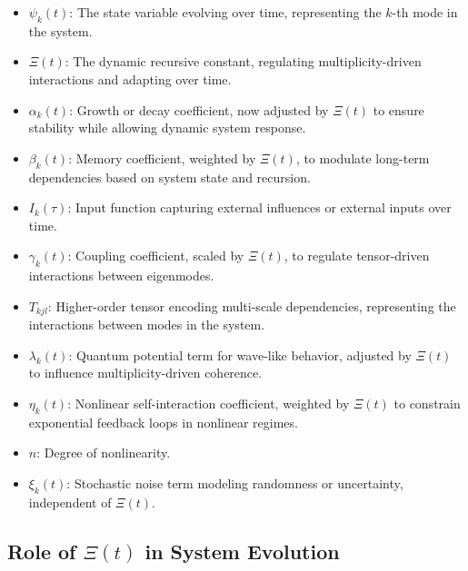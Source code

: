 \documentclass{article}
\theoremstyle{plain}
\begin{document}
\begin{itemize}
\begin{itemize}
    \item \( \psi_k(t) \): The state variable evolving over time, representing the \( k \)-th mode in the system.
    \item \(\Xi(t) \): The dynamic recursive constant, regulating multiplicity-driven interactions and adapting over time.
    \item \( \alpha_k(t) \): Growth or decay coefficient, now adjusted by \(\Xi(t) \) to ensure stability while allowing dynamic system response.
    \item \( \beta_k(t) \): Memory coefficient, weighted by \(\Xi(t) \), to modulate long-term dependencies based on system state and recursion.
    \item \( I_k(\tau) \): Input function capturing external influences or external inputs over time.
    \item \( \gamma_k(t) \): Coupling coefficient, scaled by \(\Xi(t) \), to regulate tensor-driven interactions between eigenmodes.
    \item \( T_{kjl} \): Higher-order tensor encoding multi-scale dependencies, representing the interactions between modes in the system.
    \item \( \lambda_k(t) \): Quantum potential term for wave-like behavior, adjusted by \(\Xi(t) \) to influence multiplicity-driven coherence.
    \item \( \eta_k(t) \): Nonlinear self-interaction coefficient, weighted by \(\Xi(t) \) to constrain exponential feedback loops in nonlinear regimes.
    \item \( n \): Degree of nonlinearity.
    \item \( \xi_k(t) \): Stochastic noise term modeling randomness or uncertainty, independent of \(\Xi(t) \).
\end{itemize}

\subsection{Role of \(\Xi(t) \) in System Evolution}


\end{itemize}
\end{document}
